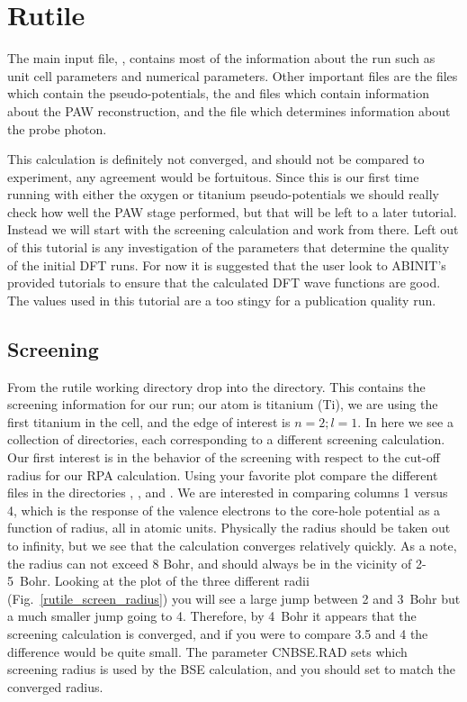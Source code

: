 \documentclass[11pt]{report}
\begin{document}
\iffalse
\section{Rutile}

The main input file, , contains most of the information about the run such as unit cell parameters and numerical parameters. Other important files are the  files which contain the pseudo-potentials, the  and  files which contain information about the PAW reconstruction, and the  file which determines information about the probe photon. 

This calculation is definitely not converged, and should not be compared to experiment, any agreement would be fortuitous. Since this is our first time running with either the oxygen or titanium pseudo-potentials we should really check how well the PAW stage performed, but that will be left to a later tutorial. Instead we will start with the screening calculation and work from there. Left out of this tutorial is any investigation of the parameters that determine the quality of the initial DFT runs. For now it is suggested that the user look to ABINIT's provided tutorials to ensure that the calculated DFT wave functions are good. The values used in this tutorial are a too stingy for a publication quality run.

\subsection{Screening}



From the rutile working directory drop into the  directory. This contains the screening information for our run; our atom is titanium (Ti), we are using the first titanium in the cell, and the edge of interest is $n=2;l=1$. In here we see a collection of directories, each corresponding to a different screening calculation. Our first interest is in the behavior of the screening with respect to the cut-off radius for our RPA calculation. Using your favorite plot compare the different  files in the directories , , and . We are interested in comparing columns 1 versus 4, which is the response of the valence electrons to the core-hole potential as a function of radius, all in atomic units. Physically the radius should be taken out to infinity, but we see that the calculation converges relatively quickly. As a note, the radius can not exceed 8 Bohr, and should always be in the vicinity of 2-5~Bohr. Looking at the plot of the three different radii (Fig.\ \ref{rutile_screen_radius}) you will see a large jump between 2 and 3~Bohr but a much smaller jump going to 4. Therefore, by 4~Bohr it appears that the screening calculation is converged, and if you were to compare 3.5 and 4 the difference would be quite small. The parameter CNBSE.RAD sets which screening radius is used by the BSE calculation, and you should set to match the converged radius.
\end{document}
